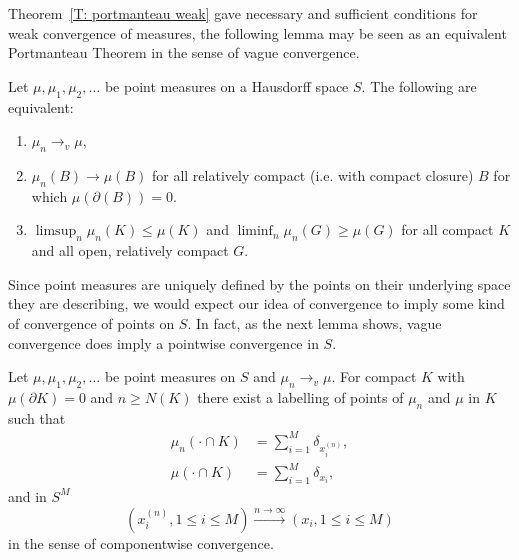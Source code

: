 Theorem~\ref{T: portmanteau weak} gave necessary and sufficient conditions for weak convergence of measures,
the following lemma may be seen as an equivalent Portmanteau Theorem in the sense of vague convergence.

\begin{lemma} \label{L: portmanteau vague}
	Let $\mu, \mu_1, \mu_2, \dots$ be point measures on a Hausdorff space $S$.
	The following are equivalent:
	\begin{enumerate}
		\item $\mu_n \rightarrow_v \mu$,
		\item $\mu_n(B) \rightarrow \mu(B)$ for all relatively compact (i.e. with compact closure) $B$ 
			for which $\mu(\partial(B)) = 0$.
		\item $\limsup_n \mu_n(K) \leq \mu(K)$ and $\liminf_n \mu_n(G) \geq \mu(G)$
			for all compact $K$ and all open, relatively compact $G$.
	\end{enumerate}
\end{lemma}

Since point measures are uniquely defined by the points on their underlying space they are describing,
we would expect our idea of convergence to imply some kind of convergence of points on $S$.
In fact, as the next lemma shows, vague convergence does imply a pointwise convergence in $S$.

\begin{lemma} \label{L: pointwise convergence}
	Let $\mu, \mu_1, \mu_2, \dots$ be point measures on $S$ and $\mu_n \rightarrow_v \mu$.
	For compact $K$ with $\mu(\partial K) = 0$ and $n \geq N(K)$
	there exist a labelling of points of $\mu_n$ and $\mu$ in $K$ such that
	\begin{equation}
	\begin{aligned}
		\mu_n(\cdot \cap K) &= \sum_{i=1}^{M} \delta_{x_i^{(n)}}, \\
		\mu(\cdot \cap K) &= \sum_{i=1}^{M} \delta_{x_i},
	\end{aligned}
	\end{equation}
	and in $S^M$
	\begin{equation}
		( x_i^{(n)}, 1 \leq i \leq M ) \xrightarrow{n \rightarrow \infty}
		( x_i, 1 \leq i \leq M  ) 
	\end{equation}
	in the sense of componentwise convergence.
\end{lemma}




